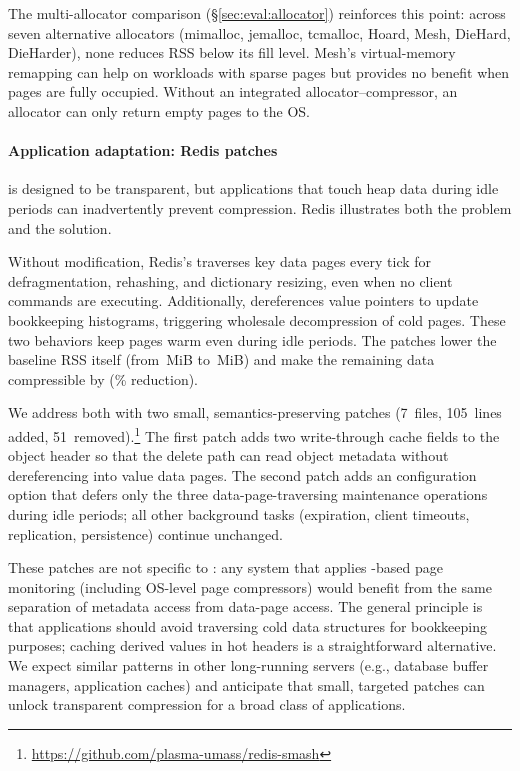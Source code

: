 The multi-allocator comparison (\S\ref{sec:eval:allocator})
reinforces this point: across seven alternative allocators
(mimalloc, jemalloc, tcmalloc, Hoard, Mesh, DieHard, DieHarder),
none reduces RSS below its fill level.  Mesh's virtual-memory
remapping can help on workloads with sparse pages but provides no
benefit when pages are fully
occupied.  Without an integrated allocator--compressor,
an allocator can only return empty pages to the OS.

\paragraph{Application adaptation: Redis patches}
\sys is designed to be transparent, but applications that touch
heap data during idle periods can inadvertently prevent compression.
Redis illustrates both the problem and the solution.

Without modification, Redis's  traverses key
data pages every tick for defragmentation, rehashing, and dictionary
resizing, even when no client commands are executing.  Additionally,
 dereferences value pointers to update bookkeeping
histograms, triggering wholesale decompression of cold pages.  These two behaviors keep pages warm even during idle periods.
The patches lower the baseline RSS itself (from
\ablRedisBaselineServeRss\,MiB to
\ablRedisPatchedBaselineServeRss\,MiB) and make the remaining
data compressible by \sys
(\ablRedisPatchedDefaultRssRedInt\% reduction).

We address both with two small, semantics-preserving patches
(7~files, 105~lines added, 51~removed).\footnote{%
\url{https://github.com/plasma-umass/redis-smash}}
The first patch adds two
write-through cache fields to the object header so that the delete
path can read object metadata without dereferencing into value data
pages.  The second patch adds an  configuration
option that defers only the three data-page-traversing maintenance
operations during idle periods; all other background tasks
(expiration, client timeouts, replication, persistence) continue
unchanged.

These patches are not specific to \sys: any system that applies
-based page monitoring (including OS-level page
compressors) would benefit from the same separation of metadata
access from data-page access.  The general principle is that
applications should avoid traversing cold data structures for
bookkeeping purposes; caching derived values in hot headers is a
straightforward alternative.  We expect similar patterns in other
long-running servers (e.g., database buffer managers, application
caches) and anticipate that small, targeted patches can unlock
transparent compression for a broad class of applications.

